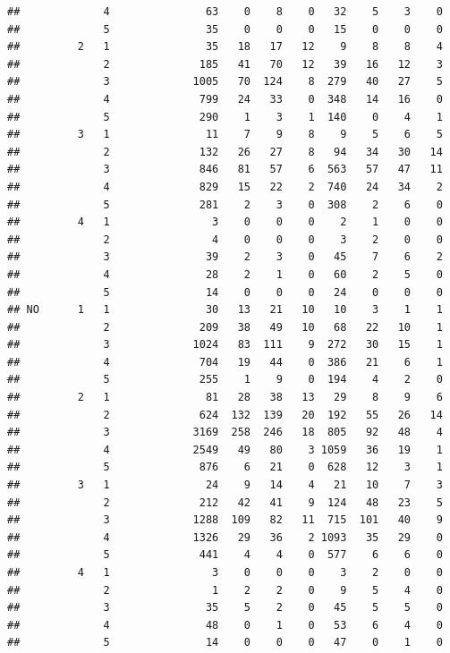 \documentclass{article}\usepackage[]{graphicx}\usepackage[]{xcolor}
\makeatletter
\newenvironment{kframe}{%
 \def\at@end@of@kframe{}%
 \ifinner\ifhmode%
  \def\at@end@of@kframe{\end{minipage}}%
  \begin{minipage}{\columnwidth}%
 \fi\fi%
 \def\FrameCommand##1{\hskip\@totalleftmargin \hskip-\fboxsep
 \colorbox{shadecolor}{##1}\hskip-\fboxsep
     \hskip-\linewidth \hskip-\@totalleftmargin \hskip\columnwidth}%
 \MakeFramed {\advance\hsize-\width
   \@totalleftmargin\z@ \linewidth\hsize
   \@setminipage}}%
 {\par\unskip\endMakeFramed%
 \at@end@of@kframe}
\newenvironment{knitrout}{}{} %
\makeatother
\begin{document}
\begin{knitrout}
\begin{kframe}
\begin{verbatim}
##             4               63    0    8    0   32    5    3    0
##             5               35    0    0    0   15    0    0    0
##         2   1               35   18   17   12    9    8    8    4
##             2              185   41   70   12   39   16   12    3
##             3             1005   70  124    8  279   40   27    5
##             4              799   24   33    0  348   14   16    0
##             5              290    1    3    1  140    0    4    1
##         3   1               11    7    9    8    9    5    6    5
##             2              132   26   27    8   94   34   30   14
##             3              846   81   57    6  563   57   47   11
##             4              829   15   22    2  740   24   34    2
##             5              281    2    3    0  308    2    6    0
##         4   1                3    0    0    0    2    1    0    0
##             2                4    0    0    0    3    2    0    0
##             3               39    2    3    0   45    7    6    2
##             4               28    2    1    0   60    2    5    0
##             5               14    0    0    0   24    0    0    0
## NO      1   1               30   13   21   10   10    3    1    1
##             2              209   38   49   10   68   22   10    1
##             3             1024   83  111    9  272   30   15    1
##             4              704   19   44    0  386   21    6    1
##             5              255    1    9    0  194    4    2    0
##         2   1               81   28   38   13   29    8    9    6
##             2              624  132  139   20  192   55   26   14
##             3             3169  258  246   18  805   92   48    4
##             4             2549   49   80    3 1059   36   19    1
##             5              876    6   21    0  628   12    3    1
##         3   1               24    9   14    4   21   10    7    3
##             2              212   42   41    9  124   48   23    5
##             3             1288  109   82   11  715  101   40    9
##             4             1326   29   36    2 1093   35   29    0
##             5              441    4    4    0  577    6    6    0
##         4   1                3    0    0    0    3    2    0    0
##             2                1    2    2    0    9    5    4    0
##             3               35    5    2    0   45    5    5    0
##             4               48    0    1    0   53    6    4    0
##             5               14    0    0    0   47    0    1    0
\end{verbatim}
\end{kframe}
\end{knitrout}
\end{document}
